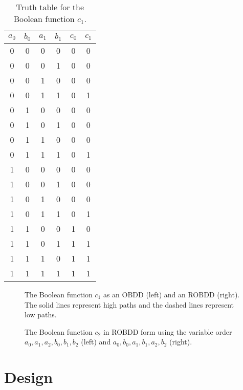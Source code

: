 \documentclass[a4paper,11pt]{kth-mag}
\begin{document}
\begin{table}
\centering
\begin{tabular}{cccc|cc}
$a_0$ & $b_0$ & $a_1$ & $b_1$ & $c_0$ & $c_1$ \\
\hline
0     & 0     & 0     & 0     & 0     & 0 \\
0     & 0     & 0     & 1     & 0     & 0 \\
0     & 0     & 1     & 0     & 0     & 0 \\
0     & 0     & 1     & 1     & 0     & 1 \\
0     & 1     & 0     & 0     & 0     & 0 \\
0     & 1     & 0     & 1     & 0     & 0 \\
0     & 1     & 1     & 0     & 0     & 0 \\
0     & 1     & 1     & 1     & 0     & 1 \\
1     & 0     & 0     & 0     & 0     & 0 \\
1     & 0     & 0     & 1     & 0     & 0 \\
1     & 0     & 1     & 0     & 0     & 0 \\
1     & 0     & 1     & 1     & 0     & 1 \\
1     & 1     & 0     & 0     & 1     & 0 \\
1     & 1     & 0     & 1     & 1     & 1 \\
1     & 1     & 1     & 0     & 1     & 1 \\
1     & 1     & 1     & 1     & 1     & 1 \\
\end{tabular}
\caption{Truth table for the Boolean function $c_1$.}
\label{tab:tt_c1}
\end{table}

\begin{figure}
\centering

\caption{The Boolean function $c_1$ as an OBDD (left) and an ROBDD (right). The solid lines represent high paths and the dashed lines represent low paths.}
\label{fig:bdd_c1}
\end{figure}

\begin{figure}
\centering

\caption{The Boolean function $c_2$ in ROBDD form using the variable order $a_0,a_1,a_2,b_0,b_1,b_2$ (left) and $a_0,b_0,a_1,b_1,a_2,b_2$ (right).}
\label{fig:bdd_c2_bad}
\end{figure}

\chapter{Design}
\label{ch:design}
\end{document}
